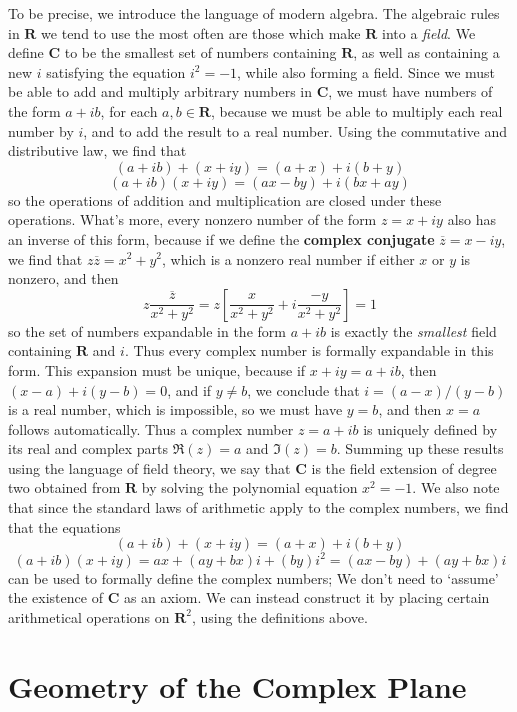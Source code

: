 To be precise, we introduce the language of modern algebra. The algebraic rules in $\mathbf{R}$ we tend to use the most often are those which make $\mathbf{R}$ into a {\it field}. We define $\mathbf{C}$ to be the smallest set of numbers containing $\mathbf{R}$, as well as containing a new $i$ satisfying the equation $i^2 = -1$, while also forming a field. Since we must be able to add and multiply arbitrary numbers in $\mathbf{C}$, we must have numbers of the form $a + ib$, for each $a,b \in \mathbf{R}$, because we must be able to multiply each real number by $i$, and to add the result to a real number. Using the commutative and distributive law, we find that
%
\[ (a + ib) + (x + iy) = (a + x) + i(b + y) \]
\[ (a + ib)(x + iy) = (ax - by) + i(bx + ay) \]
%
so the operations of addition and multiplication are closed under these operations. What's more, every nonzero number of the form $z = x + iy$ also has an inverse of this form, because if we define the {\bf complex conjugate} $\overline{z} = x - iy$, we find that $z\overline{z} = x^2 + y^2$, which is a nonzero real number if either $x$ or $y$ is nonzero, and then
%
\[ z \frac{\overline{z}}{x^2 + y^2} = z \left[ \frac{x}{x^2 + y^2} + i \frac{-y}{x^2 + y^2} \right] = 1 \]
%
so the set of numbers expandable in the form $a + ib$ is exactly the {\it smallest} field containing $\mathbf{R}$ and $i$. Thus every complex number is formally expandable in this form. This expansion must be unique, because if $x + iy = a + ib$, then $(x - a) + i(y-b) = 0$, and if $y \neq b$, we conclude that $i = (a-x)/(y-b)$ is a real number, which is impossible, so we must have $y = b$, and then $x = a$ follows automatically. Thus a complex number $z = a + ib$ is uniquely defined by its real and complex parts $\Re(z) = a$ and $\Im(z) = b$. Summing up these results using the language of field theory, we say that $\mathbf{C}$ is the field extension of degree two obtained from $\mathbf{R}$ by solving the polynomial equation $x^2 = -1$. We also note that since the standard laws of arithmetic apply to the complex numbers, we find that the equations
%
\[ (a + ib) + (x + iy) = (a + x) + i(b + y) \]
\[ (a + ib)(x + iy) = ax + (ay + bx)i + (by)i^2 = (ax - by) + (ay + bx)i \]
%
can be used to formally define the complex numbers; We don't need to `assume' the existence of $\mathbf{C}$ as an axiom. We can instead construct it by placing certain arithmetical operations on $\mathbf{R}^2$, using the definitions above.

\section{Geometry of the Complex Plane}

